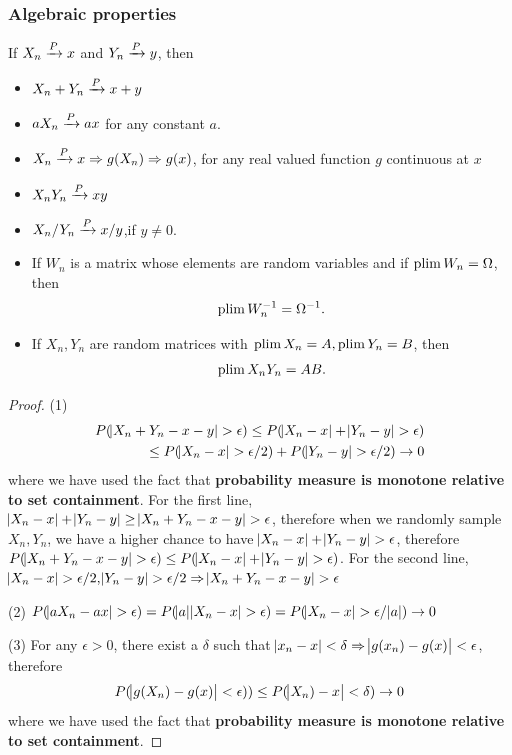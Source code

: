 \begin{refsection}
\subsubsection{Algebraic properties}


\begin{theorem}\cite[297]{hoggintroduction}\cite[1165]{greene2017econometric}
If $X_n \xrightarrow[ ]{P} x$ and $Y_n \xrightarrow[ ]{P} y$, then
\begin{itemize}
    \item $X_n+Y_n \xrightarrow[ ]{P} x + y$
    \item $aX_n \xrightarrow[ ]{P} ax$ for any constant $a$.
    \item $X_n \xrightarrow[ ]{P} x \Rightarrow g(X_n) \Rightarrow g(x)$, for any real valued function $g$ continuous at $x$
    \item $X_nY_n \xrightarrow[ ]{P} xy$
    \item $X_n/Y_n \xrightarrow[ ]{P} x/y$,if $y\neq 0$.
    \item If $W_n$ is a matrix whose elements are random variables and if $\operatorname*{plim} W_n = \Omega$, then
    $$\operatorname*{plim} W_n^{-1} = \Omega^{-1}.$$
    \item If $X_n, Y_n$ are random matrices with $\operatorname*{plim} X_n = A, \operatorname*{plim} Y_n = B$, then
    $$\operatorname*{plim} X_nY_n = AB.$$ 
\end{itemize}
\end{theorem}
\begin{proof}
	(1) 
	\begin{align*}
	P(\abs{X_n+Y_n-x-y} > \epsilon) \leq P(\abs{X_n-x}+\abs{Y_n-y} > \epsilon) \\ 
	\leq P(\abs{X_n-x} > \epsilon/2) + P(\abs{Y_n-y} > \epsilon/2) \to 0
	\end{align*}
	where we have used the fact that \textbf{probability measure is monotone relative to set containment}. For the first line, $\abs{X_n-x}+\abs{Y_n-y} \geq \abs{X_n+Y_n-x-y} >\epsilon$, therefore when we randomly sample $X_n,Y_n$, we have a higher chance to have $\abs{X_n-x}+\abs{Y_n-y} > \epsilon$, therefore $P(\abs{X_n+Y_n-x-y} > \epsilon) \leq P(\abs{X_n-x}+\abs{Y_n-y} > \epsilon)$. For the second line,  $\abs{X_n-x} > \epsilon/2 ,\abs{Y_n-y} > \epsilon/2 \Rightarrow \abs{X_n+Y_n-x-y} > \epsilon$
	
	(2) $P(\abs{aX_n-ax} > \epsilon) =P(\abs{a}\abs{X_n-x} >\epsilon) = P(\abs{X_n-x} >\epsilon/\abs{a}) \to 0$
	
	(3) For any $\epsilon > 0$, there exist a $\delta$ such that $\abs{x_n - x} <\delta \Rightarrow \abs{g(x_n)-g(x)} < \epsilon$, therefore
	$$P(\abs{g(X_n)-g(x)} < \epsilon)) \leq P(\abs{X_n) - x} < \delta) \to 0$$
	where we have used the fact that \textbf{probability measure is monotone relative to set containment}. 
	

\end{proof}
\end{refsection}
